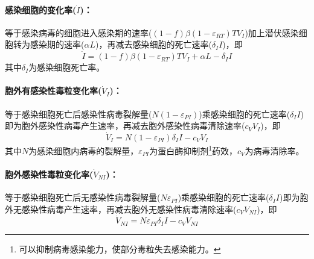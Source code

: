 \documentclass{ctexart}
\begin{document}
\paragraph{感染细胞的变化率($\dot{I}$)：}等于感染病毒的细胞进入感染期的速率($(1-f)\beta (1-\varepsilon _{RT})TV_{I}$)加上潜伏感染细胞转为感染期的速率($\alpha L$)，再减去感染细胞的死亡速率($\delta _{I}I$)，即
$$\dot{I}=(1-f)\beta (1-\varepsilon _{RT})TV_{I}+\alpha L-\delta _{I}I$$
其中$\delta _{I}$为感染细胞死亡率。

\paragraph{胞外有感染性毒粒变化率($\dot{V}_{I}$)：}等于感染细胞死亡后感染性病毒裂解量($N(1-\varepsilon _{PI})$)乘感染细胞的死亡速率($\delta _{I}I$)即为胞外感染性病毒产生速率，再减去胞外感染性病毒清除速率($c_{V}V_{I}$)，即
$$\dot{V}_{I}=N(1-\varepsilon _{PI})\delta _{I}I-c_{V}V_{I}$$
其中$N$为感染细胞内病毒的裂解量，$\varepsilon _{PI}$为蛋白酶抑制剂\footnote{可以抑制病毒感染能力，使部分毒粒失去感染能力。}药效，$c_{V}$为病毒清除率。

\paragraph{胞外感染性毒粒变化率($\dot{V}_{NI}$)：}等于感染细胞死亡后无感染性病毒裂解量($N\varepsilon _{PI}$)乘感染细胞的死亡速率($\delta _{I}I$)即为胞外无感染性病毒产生速率，再减去胞外无感染性病毒清除速率($c_{V}V_{NI}$)，即
$$\dot{V}_{NI}=N\varepsilon _{PI}\delta _{I}I-c_{V}V_{NI}$$
\end{document}
